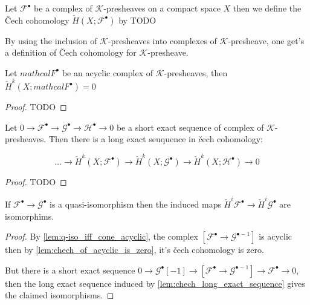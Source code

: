 \begin{definition}\label{def:chech_of_compelx_of_k_prsh}
    Let $\mathcal{F}^{\bullet}$ be a complex of $\mathcal{K}$-presheaves on a compact space $X$ then we define the \v{C}ech cohomology $\check{H}(X;\mathcal{F}^{\bullet})$ by TODO
\end{definition}

\begin{remark}\label{def:chech_of_k_prsh}
    By using the inclusion of $\mathcal{K}$-presheaves into complexes of $\mathcal{K}$-presheave, one get's a definition of \v{C}ech cohomology for $\mathcal{K}$-presheave.
\end{remark}

\begin{lemma}\label{lem:chech_of_acyclic_is_zero}
    Let $mathcal{F}^{\bullet}$ be an acyclic complex of $\mathcal{K}$-presheaves, then $\check{H}^k(X;mathcal{F}^{\bullet})=0$

\end{lemma}

\begin{proof}
    TODO
\end{proof}

\begin{lemma}\label{lem:chech_long_exact_sequence}
    Let $0\to \mathcal{F}^{\bullet}\to \mathcal{G}^{\bullet}\to \mathcal{H}^{\bullet}\to 0$ be a short exact sequence of complex of $\mathcal{K}$-presheaves. Then there is a long exact seuquence in \v{c}ech cohomology: 

    \[\ldots\to \check{H}^k(X;\mathcal{F}^{\bullet})\to \check{H}^k(X;\mathcal{G}^{\bullet})\to \check{H}^k(X;\mathcal{H}^{\bullet})\to 0\]

\end{lemma}

\begin{proof}
    TODO
\end{proof}

\begin{lemma}\label{lem:chech_preserve_quasi_iso}
    If $\mathcal{F}^{\bullet}\to\mathcal{G}^{\bullet}$ is a quasi-isomorphism then the induced maps $\check{H}^i\mathcal{F}^{\bullet}\to \check{H}^i\mathcal{G}^{\bullet}$ are isomorphims.
\end{lemma}

\begin{proof}
    By \ref{lem:q-iso_iff_cone_acyclic}, the complex $[\mathcal{F}^{\bullet}\to \mathcal{G}^{\bullet-1}]$ is acyclic then by \ref{lem:chech_of_acyclic_is_zero}, it's \v{c}ech cohomology is zero.

    But there is a short exact sequence $0\to \mathcal{G}^{\bullet}[-1]\to [\mathcal{F}^{\bullet}\to \mathcal{G}^{\bullet-1}]\to \mathcal{F}^{\bullet} \to 0$, then the long exact sequence induced by \ref{lem:chech_long_exact_sequence} gives the claimed isomorphisms.
\end{proof}

